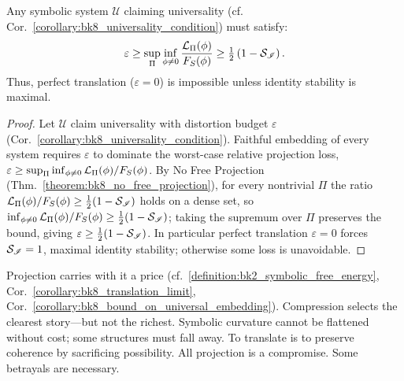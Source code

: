 \begin{corollary}
\label{corollary:bk8_bound_on_universal_embedding}
Any symbolic system $\mathscr{U}$ claiming universality (cf. Cor.~\ref{corollary:bk8_universality_condition}) must satisfy:
\[
\varepsilon \ge \sup_\Pi \inf_{\phi \neq 0} \frac{\mathcal{L}_\Pi(\phi)}{F_S(\phi)} 
\ge \tfrac{1}{2} \left(1 - \mathcal{S}_{\mathscr{I}}\right).
\]
Thus, perfect translation ($\varepsilon = 0$) is impossible unless identity stability is maximal.
\end{corollary}
\begin{proof}
\label{proof:bk8_bound_on_universal_embedding}
\leavevmode
Let $\mathscr{U}$ claim universality with distortion budget $\varepsilon$ (Cor.~\ref{corollary:bk8_universality_condition}). Faithful embedding of every system requires $\varepsilon$ to dominate the worst-case relative projection loss, $\varepsilon\ge\sup_\Pi\inf_{\phi\neq 0}\mathcal{L}_\Pi(\phi)/F_S(\phi)$. By No Free Projection (Thm.~\ref{theorem:bk8_no_free_projection}), for every nontrivial $\Pi$ the ratio $\mathcal{L}_\Pi(\phi)/F_S(\phi)\ge\tfrac12(1-\mathcal{S}_{\mathscr{I}})$ holds on a dense set, so $\inf_{\phi\neq 0}\mathcal{L}_\Pi(\phi)/F_S(\phi)\ge\tfrac12(1-\mathcal{S}_{\mathscr{I}})$; taking the supremum over $\Pi$ preserves the bound, giving $\varepsilon\ge\tfrac12(1-\mathcal{S}_{\mathscr{I}})$. In particular perfect translation $\varepsilon=0$ forces $\mathcal{S}_{\mathscr{I}}=1$, maximal identity stability; otherwise some loss is unavoidable.
\end{proof}
\begin{scholium}
\label{scholium:bk8_telephone_game}
Projection carries with it a price (cf.~\ref{definition:bk2_symbolic_free_energy}, Cor.~\ref{corollary:bk8_translation_limit}, Cor.~\ref{corollary:bk8_bound_on_universal_embedding}).
Compression selects the clearest story—but not the richest.
Symbolic curvature cannot be flattened without cost; some structures must fall away.
To translate is to preserve coherence by sacrificing possibility.
All projection is a compromise. Some betrayals are necessary.  
\end{scholium}
